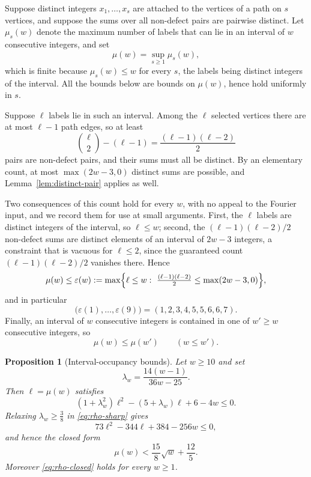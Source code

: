 \documentclass[11pt]{article}
\newtheorem{proposition}[theorem]{Proposition}
\theoremstyle{definition}
\theoremstyle{remark}
\numberwithin{equation}{section}
\DeclarePairedDelimiter{\set}{\{}{\}}
\begin{document}
Suppose distinct integers $x_1,\ldots,x_s$ are attached to the vertices of a path on $s$ vertices, and suppose the sums over all non-defect pairs are pairwise distinct. Let $\mu_s(w)$ denote the maximum number of labels that can lie in an interval of $w$ consecutive integers, and set
\[
  \mu(w)=\sup_{s\ge1}\mu_s(w),
\]
which is finite because $\mu_s(w)\le w$ for every $s$, the labels being distinct integers of the interval. All the bounds below are bounds on $\mu(w)$, hence hold uniformly in $s$.

Suppose $\ell$ labels lie in such an interval. Among the $\ell$ selected vertices there are at most $\ell-1$ path edges, so at least
\[
  \binom{\ell}{2}-(\ell-1)=\frac{(\ell-1)(\ell-2)}2
\]
pairs are non-defect pairs, and their sums must all be distinct. By an elementary count, at most $\max(2w-3,0)$ distinct sums are possible, and Lemma~\ref{lem:distinct-pair} applies as well.

Two consequences of this count hold for every $w$, with no
appeal to the Fourier input, and we record them for use at small arguments.
First, the $\ell$ labels are distinct integers of the interval, so $\ell\le w$;
second, the $(\ell-1)(\ell-2)/2$ non-defect sums are distinct elements of an interval
of $2w-3$ integers, a constraint that is vacuous for $\ell\le2$, since the guaranteed
count $(\ell-1)(\ell-2)/2$ vanishes there. Hence
\begin{equation}\label{eq:rho-elementary}
  \mu(w)\le\varepsilon(w):=
  \max\set*{\ell\le w:\ \tfrac{(\ell-1)(\ell-2)}2\le\max(2w-3,0)},
\end{equation}
and in particular
\begin{equation}\label{eq:rho-small}
  \bigl(\varepsilon(1),\ldots,\varepsilon(9)\bigr)=(1,2,3,4,5,5,6,6,7).
\end{equation}
Finally, an interval of $w$ consecutive integers is contained in one of $w'\ge w$
consecutive integers, so
\begin{equation}\label{eq:rho-monotone}
  \mu(w)\le\mu(w')\qquad(w\le w').
\end{equation}

\begin{proposition}[Interval-occupancy bounds]\label{lem:rho-closed}
Let $w\ge10$ and set
\[
  \lambda_w=\frac{14(w-1)}{36w-25}.
\]
Then $\ell=\mu(w)$ satisfies
\begin{equation}\label{eq:rho-sharp}
  (1+\lambda_w^2)\ell^2-(5+\lambda_w)\ell+6-4w\le0.
\end{equation}
Relaxing $\lambda_w\ge\tfrac38$ in \eqref{eq:rho-sharp} gives
\begin{equation}\label{eq:rho-quadratic}
  73\ell^2-344\ell+384-256w\le0,
\end{equation}
and hence the closed form
\begin{equation}\label{eq:rho-closed}
  \mu(w)<\frac{15}{8}\sqrt w+\frac{12}{5}.
\end{equation}
Moreover \eqref{eq:rho-closed} holds for every $w\ge1$.
\end{proposition}
\end{document}
